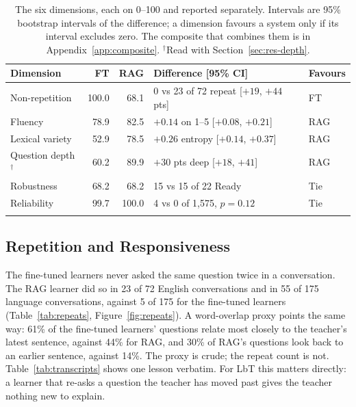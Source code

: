 \documentclass[pdflatex,sn-mathphys-num]{sn-jnl}%
\theoremstyle{thmstyleone}%
\theoremstyle{thmstyletwo}%
\theoremstyle{thmstylethree}%
\begin{document}
\begin{table}[t]
\caption{The six dimensions, each on 0--100 and reported separately. Intervals are 95\% bootstrap
intervals of the difference; a dimension favours a system only if its interval excludes zero. The
composite that combines them is in Appendix~\ref{app:composite}. $^\dagger$Read with
Section~\ref{sec:res-depth}.}\label{tab:dimensions}
\footnotesize
\begin{tabular*}{\textwidth}{@{\extracolsep\fill}lrrll}
\toprule
Dimension & FT & RAG & Difference [95\% CI] & Favours \\
\midrule
Non-repetition & 100.0 & 68.1 & 0 vs 23 of 72 repeat [$+19$, $+44$ pts] & FT \\
Fluency & 78.9 & 82.5 & $+0.14$ on 1--5 [$+0.08$, $+0.21$] & RAG \\
Lexical variety & 52.9 & 78.5 & $+0.26$ entropy [$+0.14$, $+0.37$] & RAG \\
Question depth$^\dagger$ & 60.2 & 89.9 & $+30$ pts deep [$+18$, $+41$] & RAG \\
Robustness & 68.2 & 68.2 & 15 vs 15 of 22 Ready & Tie \\
Reliability & 99.7 & 100.0 & 4 vs 0 of 1,575, $p=0.12$ & Tie \\
\botrule
\end{tabular*}
\end{table}

\subsection{Repetition and Responsiveness}\label{sec:res-repeats}

The fine-tuned learners never asked the same question twice in a conversation. The RAG learner did so
in 23 of 72 English conversations and in 55 of 175 language conversations, against 5 of 175 for the
fine-tuned learners (Table~\ref{tab:repeats}, Figure~\ref{fig:repeats}). A word-overlap proxy points
the same way: 61\% of the fine-tuned learners' questions relate most closely to the teacher's latest
sentence, against 44\% for RAG, and 30\% of RAG's questions look back to an earlier sentence, against
14\%. The proxy is crude; the repeat count is not. Table~\ref{tab:transcripts} shows one lesson
verbatim. For LbT this matters directly: a learner that re-asks a question the teacher has moved past
gives the teacher nothing new to explain.
\end{document}
